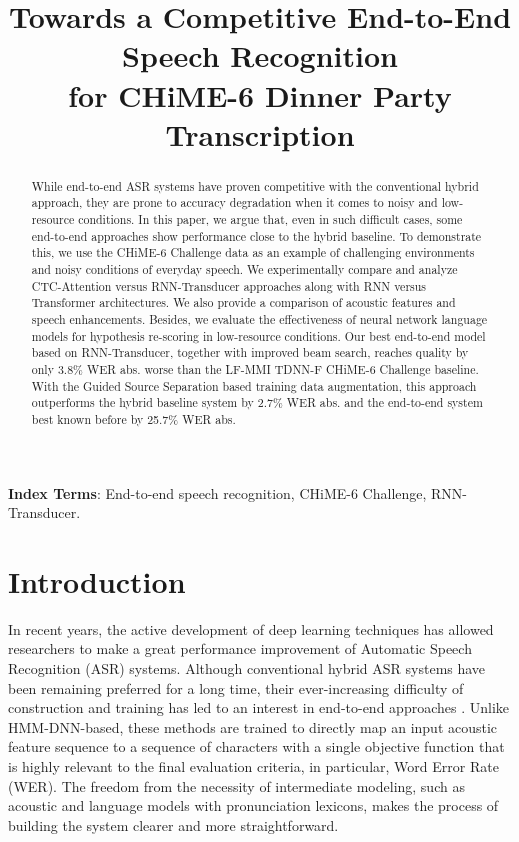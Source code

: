 \documentclass[a4paper]{article}
\title{Towards a Competitive End-to-End Speech Recognition \protect\\ for CHiME-6 Dinner Party Transcription}
\begin{document}
\maketitle
\begin{abstract}
While end-to-end ASR systems have proven competitive with the conventional hybrid approach, they are prone to accuracy degradation when it comes to noisy and low-resource conditions. 
  In this paper, we argue that, even in such difficult cases, some end-to-end approaches show performance close to the hybrid baseline. To demonstrate this, we use the CHiME-6 Challenge data as an example of challenging environments and noisy conditions of everyday speech. We experimentally compare and analyze CTC-Attention versus RNN-Transducer approaches along with RNN versus Transformer architectures. We also provide a comparison of acoustic features and speech enhancements.
  Besides, we evaluate the effectiveness of neural network language models for hypothesis re-scoring in low-resource conditions.
  Our best end-to-end model based on RNN-Transducer, together with improved beam search, reaches quality by only 3.8\% WER abs. worse than the LF-MMI TDNN-F CHiME-6 Challenge baseline. With the Guided Source Separation based training data augmentation, this approach outperforms the hybrid baseline system by 2.7\% WER abs. and the end-to-end system best known before by 25.7\% WER abs.
\end{abstract}
\noindent\textbf{Index Terms}: End-to-end speech recognition, CHiME-6 Challenge, RNN-Transducer.

\section{Introduction}

In recent years, the active development of deep learning techniques has allowed researchers to make a great performance improvement of Automatic Speech Recognition (ASR) systems. Although conventional hybrid ASR systems \cite{hinton_hmm-dnn} have been remaining preferred for a long time, their ever-increasing difficulty of construction and training \cite{medennikov_stc_2019} has led to an interest in end-to-end approaches \cite{graves_connectionist_2006,chan2015listen}. Unlike HMM-DNN-based, these methods are trained to directly map an input acoustic feature sequence to a sequence of characters with a single objective function that is highly relevant to the final evaluation criteria, in particular, Word Error Rate (WER). The freedom from the necessity of intermediate modeling, such as acoustic and language models with pronunciation lexicons, makes the process of building the system clearer and more straightforward.
\end{document}

